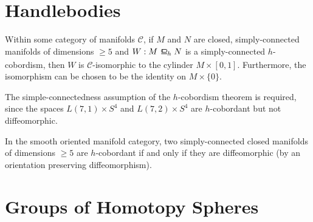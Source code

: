 \section{Handlebodies}

\begin{theorem}[$h$-cobordism]
	Within some category of manifolds $\mathscr{C}$, if $M$ and $N$ are closed, simply-connected manifolds of dimensions $\geq 5$ and $W : M \hbord N$ is a simply-connected $h$-cobordism, then $W$ is $\mathscr{C}$-isomorphic to the cylinder $M\times [0,1]$. Furthermore, the isomorphism can be chosen to be the identity on $M\times \{0\}$.
\end{theorem}

\begin{example}
  The simple-connectedness assumption of the $h$-cobordism theorem is required, since the spaces $L(7,1)\times S^4$ and $L(7,2)\times S^4$ are $h$-cobordant but not diffeomorphic.
\end{example}

\begin{corollary}\label{thm:h-cobordism-diffeomorphism}
	In the smooth oriented manifold category, two simply-connected closed manifolds of dimensions $\geq 5$ are $h$-cobordant if and only if they are diffeomorphic (by an orientation preserving diffeomorphism).
\end{corollary}

\section{Groups of Homotopy Spheres}
